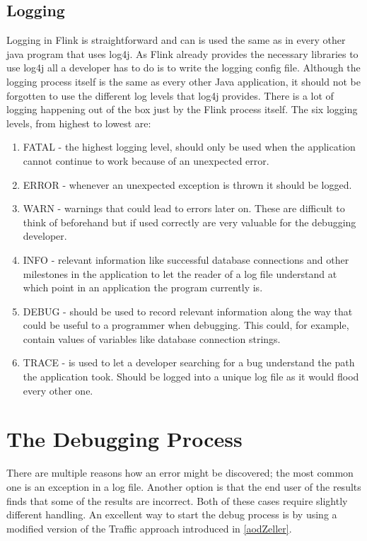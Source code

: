 \subsection{Logging}
Logging in Flink is straightforward and can is used the same as in every other java program that uses log4j. As Flink already provides the necessary libraries to use log4j all a developer has to do is to write the logging config file. Although the logging process itself is the same as every other Java application, it should not be forgotten to use the different log levels that log4j provides. There is a lot of logging happening out of the box just by the Flink process itself. The six logging levels, from highest to lowest are:
\begin{enumerate}
  \item FATAL - the highest logging level, should only be used when the application cannot continue to work because of an unexpected error.
  \item ERROR - whenever an unexpected exception is thrown it should be logged.
  \item WARN - warnings that could lead to errors later on. These are difficult to think of beforehand but if used correctly are very valuable for the debugging developer.
  \item INFO - relevant information like successful database connections and other milestones in the application to let the reader of a log file understand at which point in an application the program currently is.
  \item DEBUG - should be used to record relevant information along the way that could be useful to a programmer when debugging. This could, for example, contain values of variables like database connection strings.
  \item TRACE - is used to let a developer searching for a bug understand the path the application took. Should be logged into a unique log file as it would flood every other one.
\end{enumerate}

\section{The Debugging Process}

There are multiple reasons how an error might be discovered; the most common one is an exception in a log file. Another option is that the end user of the results finds that some of the results are incorrect. Both of these cases require slightly different handling. An excellent way to start the debug process is by using a modified version of the Traffic approach introduced in \ref{aodZeller}.

